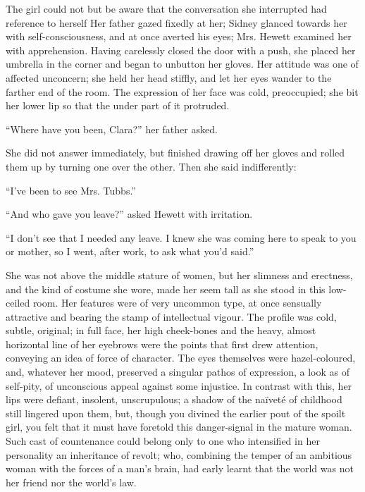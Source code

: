 The girl could not but be aware that the conversation she interrupted
had reference to herself Her father gazed fixedly at her; Sidney glanced
towards her with self-consciousness, and at once averted his eyes;
{\protect\hypertarget{60}{}{}}Mrs. Hewett examined her with
apprehension. Having carelessly closed the door with a push, she placed
her umbrella in the corner and began to unbutton her gloves. Her
attitude was one of affected unconcern; she held her head stiffly, and
let her eyes wander to the farther end of the room. The expression of
her face was cold, preoccupied; she bit her lower lip so that the under
part of it protruded.

``Where have you been, Clara?'' her father asked.

She did not answer immediately, but finished drawing off her gloves and
rolled them up by turning one over the other. Then she said
indifferently:

``I've been to see Mrs. Tubbs.''

``And who gave you leave?'' asked Hewett with irritation.

``I don't see that I needed any leave. I knew she was coming here to
speak to you or mother, so I went, after work, to ask what you'd said.''

She was not above the middle stature of
{\protect\hypertarget{61}{}{}}women, but her slimness and erectness, and
the kind of costume she wore, made her seem tall as she stood in this
low-ceiled room. Her features were of very uncommon type, at once
sensually attractive and bearing the stamp of intellectual vigour. The
profile was cold, subtle, original; in full face, her high cheek-bones
and the heavy, almost horizontal line of her eyebrows were the points
that first drew attention, conveying an idea of force of character. The
eyes themselves were hazel-coloured, and, whatever her mood, preserved a
singular pathos of expression, a look as of self-pity, of unconscious
appeal against some injustice. In contrast with this, her lips were
defiant, insolent, unscrupulous; a shadow of the naïveté of childhood
still lingered upon them, but, though you divined the earlier pout of
the spoilt girl, you felt that it must have foretold this danger-signal
in the mature woman. Such cast of countenance could belong only to one
who intensified in her personality an inheritance of revolt; who,
combining the temper of an ambitious woman
{\protect\hypertarget{62}{}{}}with the forces of a man's brain, had
early learnt that the world was not her friend nor the world's law.

